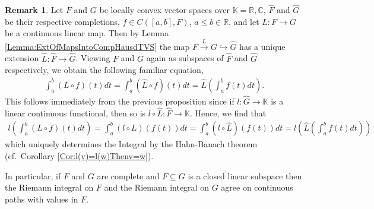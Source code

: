 \documentclass[12pt,a4paper]{article}
\theoremstyle{plain}
\theoremstyle{definition}
\newtheorem{remark}[theorem]{Remark}
\newcommand{\R}{\mathbb{R}}
\newcommand{\K}{\mathbb{K}}
\begin{document}
\begin{remark}
\label{Rem:IntegralCommWithLinMap}
Let $F$ and $G$ be locally convex vector spaces over $\K=\R,\mathbb C$, $\hat F$ and $\hat G$ be their respective completions, $f\in C([a,b],F)$, $a\leq b\in \R$, and let $L: F\to G$ be a continuous linear map. Then by Lemma \ref{Lemma:ExtOfMapsIntoCompHausdTVS} the map $F\xrightarrow{L} G\hookrightarrow \hat G$ has a unique extension $\hat L:\hat F\to \hat G$. Viewing $F$ and $G$ again as subspaces of $\hat F$ and $\hat G$ respectively, we obtain the following familiar equation,
\begin{align*}
    \int_a^b (L\circ f)(t)dt=\int_a^b (\hat L\circ f)(t)dt=\hat L\left(\int_a^bf(t)dt\right).
\end{align*}
This follows immediately from the previous proposition since if $l:\hat G\to \K$ is a linear continuous functional, then so is $l\circ \hat L:\hat F\to \K$. Hence, we find that
\begin{align*}
    l\left(\int_a^b(L\circ f)(t)dt\right)
    =\int_a^b (l\circ L)(f(t))dt=\int_a^b (l\circ \hat L)(f(t))dt
    =l\left(\hat L\left(\int_a^bf(t)dt\right)\right)
\end{align*}
which uniquely determines the Integral by the Hahn-Banach theorem (cf.~Corollary \ref{Cor:l(v)=l(w)Thenv=w}).

In particular, if $F$ and $G$ are complete and $F\subseteq G$ is a closed linear subspace then the Riemann integral on $F$ and the Riemann integral on $G$ agree on continuous paths with values in $F$.
\end{remark}
\end{document}
